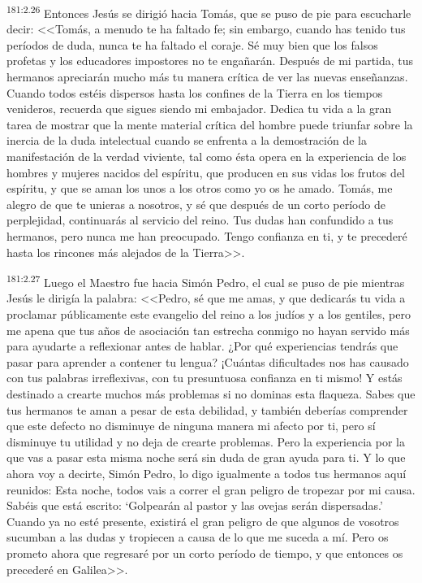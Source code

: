 \par 
\textsuperscript{181:2.26} Entonces Jesús se dirigió hacia Tomás, que se puso de pie para escucharle decir: <<Tomás, a menudo te ha faltado fe; sin embargo, cuando has tenido tus períodos de duda, nunca te ha faltado el coraje. Sé muy bien que los falsos profetas y los educadores impostores no te engañarán. Después de mi partida, tus hermanos apreciarán mucho más tu manera crítica de ver las nuevas enseñanzas. Cuando todos estéis dispersos hasta los confines de la Tierra en los tiempos venideros, recuerda que sigues siendo mi embajador. Dedica tu vida a la gran tarea de mostrar que la mente material crítica del hombre puede triunfar sobre la inercia de la duda intelectual cuando se enfrenta a la demostración de la manifestación de la verdad viviente, tal como ésta opera en la experiencia de los hombres y mujeres nacidos del espíritu, que producen en sus vidas los frutos del espíritu, y que se aman los unos a los otros como yo os he amado. Tomás, me alegro de que te unieras a nosotros, y sé que después de un corto período de perplejidad, continuarás al servicio del reino. Tus dudas han confundido a tus hermanos, pero nunca me han preocupado. Tengo confianza en ti, y te precederé hasta los rincones más alejados de la Tierra>>.

\par 
\textsuperscript{181:2.27} Luego el Maestro fue hacia Simón Pedro, el cual se puso de pie mientras Jesús le dirigía la palabra: <<Pedro, sé que me amas, y que dedicarás tu vida a proclamar públicamente este evangelio del reino a los judíos y a los gentiles, pero me apena que tus años de asociación tan estrecha conmigo no hayan servido más para ayudarte a reflexionar antes de hablar. ¿Por qué experiencias tendrás que pasar para aprender a contener tu lengua? ¡Cuántas dificultades nos has causado con tus palabras irreflexivas, con tu presuntuosa confianza en ti mismo! Y estás destinado a crearte muchos más problemas si no dominas esta flaqueza. Sabes que tus hermanos te aman a pesar de esta debilidad, y también deberías comprender que este defecto no disminuye de ninguna manera mi afecto por ti, pero sí disminuye tu utilidad y no deja de crearte problemas. Pero la experiencia por la que vas a pasar esta misma noche será sin duda de gran ayuda para ti. Y lo que ahora voy a decirte, Simón Pedro, lo digo igualmente a todos tus hermanos aquí reunidos: Esta noche, todos vais a correr el gran peligro de tropezar por mi causa. Sabéis que está escrito: `Golpearán al pastor y las ovejas serán dispersadas.' Cuando ya no esté presente, existirá el gran peligro de que algunos de vosotros sucumban a las dudas y tropiecen a causa de lo que me suceda a mí. Pero os prometo ahora que regresaré por un corto período de tiempo, y que entonces os precederé en Galilea>>.

